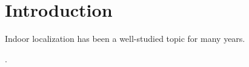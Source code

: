 \section{Introduction}
\label{sec:introduction}

Indoor localization has been a well-studied topic for many years.

\cite{JensenEtAl:11:Lab}.

